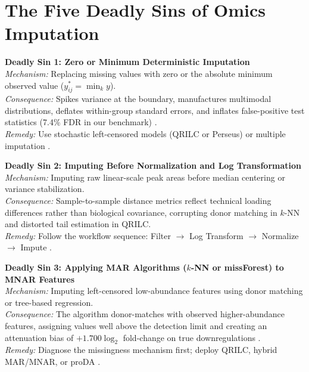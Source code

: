 \documentclass[11pt,oneside]{book}
\begin{document}
\section{The Five Deadly Sins of Omics Imputation}

\begin{pitfallbox}
\textbf{Deadly Sin 1: Zero or Minimum Deterministic Imputation}\\
\textit{Mechanism:} Replacing missing values with zero or the absolute minimum observed value ($y_{ij}^* = \min_k y$).\\
\textit{Consequence:} Spikes variance at the boundary, manufactures multimodal distributions, deflates within-group standard errors, and inflates false-positive test statistics (7.4\% FDR in our benchmark) \cite{lazar2016accounting}.\\
\textit{Remedy:} Use stochastic left-censored models (QRILC or Perseus) or multiple imputation \cite{tyanova2016perseus, rubin1987multiple}.
\end{pitfallbox}

\begin{pitfallbox}
\textbf{Deadly Sin 2: Imputing Before Normalization and Log Transformation}\\
\textit{Mechanism:} Imputing raw linear-scale peak areas before median centering or variance stabilization.\\
\textit{Consequence:} Sample-to-sample distance metrics reflect technical loading differences rather than biological covariance, corrupting donor matching in $k$-NN and distorted tail estimation in QRILC.\\
\textit{Remedy:} Follow the workflow sequence: Filter $\to$ Log Transform $\to$ Normalize $\to$ Impute \cite{julian2024rprogramming, valikangas2018systematic}.
\end{pitfallbox}

\begin{pitfallbox}
\textbf{Deadly Sin 3: Applying MAR Algorithms ($k$-NN or missForest) to MNAR Features}\\
\textit{Mechanism:} Imputing left-censored low-abundance features using donor matching or tree-based regression.\\
\textit{Consequence:} The algorithm donor-matches with observed higher-abundance features, assigning values well above the detection limit and creating an attenuation bias of $+1.700 \log_2$ fold-change on true downregulations \cite{palstrom2020imputation, lazar2016accounting}.\\
\textit{Remedy:} Diagnose the missingness mechanism first; deploy QRILC, hybrid MAR/MNAR, or proDA \cite{ahlmann2020proda, palstrom2020imputation}.
\end{pitfallbox}
\end{document}
